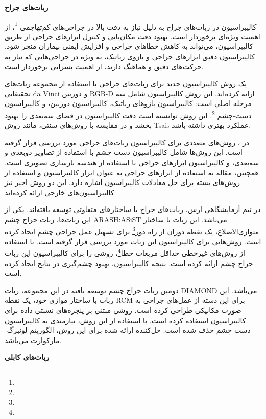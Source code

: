  
 \textbf {ربات‌های جراح}
 
 کالیبراسیون در ربات‌های جراح به دلیل نیاز به دقت بالا در جراحی‌های کم‌تهاجمی
 \footnote{}،
 از اهمیت ویژه‌ای برخوردار است. بهبود دقت مکان‌یابی و کنترل ابزارهای جراحی از طریق کالیبراسیون، می‌تواند به کاهش خطاهای جراحی و افزایش ایمنی بیماران منجر شود. کالیبراسیون دقیق ابزارهای جراحی و بازوی رباتیک، به ویژه در جراحی‌هایی که نیاز به حرکت‌های دقیق و هماهنگ دارند، از اهمیت بسزایی برخوردار است.
 
\cite{roberti2020improving}
یک روش کالیبراسیون جدید برای ربات‌های جراحی با استفاده از مجموعه‌ ربات‌های تحقیقاتی da Vinci و دوربین RGB-D ارائه کرده‌اند. این روش کالیبراسیون شامل سه مرحله اصلی است: کالیبراسیون بازوهای رباتیک، کالیبراسیون دوربین، و کالیبراسیون دست-چشم
\footnote{}.
 این روش توانسته است دقت کالیبراسیون در فضای سه‌بعدی را بهبود بخشد و در مقایسه با روش‌های سنتی، مانند روش Tsai، عملکرد بهتری داشته باشد.
 
 در 
 \cite{wang2017vision}،
روش‌های متعددی برای کالیبراسیون ربات‌های جراحی مورد بررسی قرار گرفته است. این روش‌ها شامل کالیبراسیون دست-چشم با استفاده از تصاویر دوبعدی و سه‌بعدی، و کالیبراسیون ابزارهای جراحی با استفاده از هندسه بازسازی تصویری است. همچنین، مقاله به استفاده از ابزارهای جراحی به عنوان ابزار کالیبراسیون و استفاده از روش‌های بسته برای حل معادلات کالیبراسیون اشاره دارد. این دو روش اخیر نیز کالیبراسیون‌های خارجی ارائه کرده‌اند. 

در تیم آزمایشگاهی ارس، ربات‌های جراح با ساختارهای متفاوتی توسعه یافته‌اند. یکی از این ربات‌ها، ربات جراح چشم ARASH:ASiST می‌باشد. این ربات با ساختار متوازی‌الاضلاع، یک نقطه دوران از راه دور\footnote{} برای تسهیل عمل جراحی چشم ایجاد کرده است. روش‌هایی برای کالیبراسیون این ربات مورد بررسی قرار گرفته است. \cite{hassani2021kinematic} با استفاده از روش‌های غیرخطی حداقل مربعات خطا\footnote{}، روشی را برای کالیبراسیون این ربات جراح چشم ارائه کرده است. نتیجه کالیبراسیون، بهبود چشم‌گیری در نتایج ایجاد کرده است.

دومین ربات جراح چشم توسعه یافته در این مجموعه، ربات DIAMOND می‌باشد. این ربات با ساختار موازی خود، یک نقطه RCM برای این دسته از عمل‌های جراحی به صورت مکانیکی طراحی کرده است. \cite{dindarloo2023kinematic} روشی مبتنی بر پنجره‌های نسبتی داده برای کالیبراسیون استفاده کرده است. با استفاده از این روش، نیازمندی به کالیبراسیون دست-چشم حذف شده است. حل‌کننده ارائه شده برای این روش، الگوریتم لونبرگ-مارکوارت می‌باشد.

\textbf {ربات‌های کابلی}

